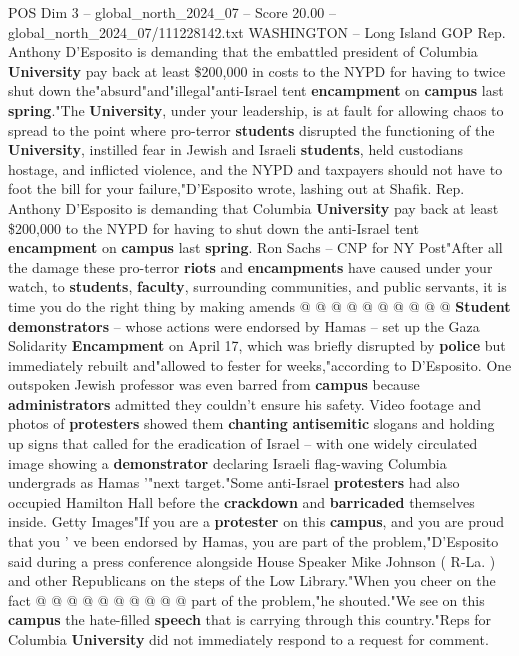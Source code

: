\begin{textsample}{POS Dim 3 – global\_north\_2024\_07 – Score 20.00 – global\_north\_2024\_07/111228142.txt}  \label{ex:f3_pos_084}
WASHINGTON -- Long Island GOP Rep.
Anthony D'Esposito is demanding that the embattled president of Columbia \textbf{University} pay back at least \$200,000 in costs to the NYPD for having to twice shut down the"absurd"and"illegal"anti-Israel tent \textbf{encampment} on \textbf{campus} last \textbf{spring}."The \textbf{University}, under your leadership, is at fault for allowing chaos to spread to the point where pro-terror \textbf{students} disrupted the functioning of the \textbf{University}, instilled fear in Jewish and Israeli \textbf{students}, held custodians hostage, and inflicted violence, and the NYPD and taxpayers should not have to foot the bill for your failure,"D'Esposito wrote, lashing out at Shafik.
Rep.
Anthony D'Esposito is demanding that Columbia \textbf{University} pay back at least \$200,000 to the NYPD for having to shut down the anti-Israel tent \textbf{encampment} on \textbf{campus} last \textbf{spring}.
Ron Sachs -- CNP for NY Post"After all the damage these pro-terror \textbf{riots} and \textbf{encampments} have caused under your watch, to \textbf{students}, \textbf{faculty}, surrounding communities, and public servants, it is time you do the right thing by making amends @ @ @ @ @ @ @ @ @ @ \textbf{Student} \textbf{demonstrators} -- whose actions were endorsed by Hamas -- set up the Gaza Solidarity \textbf{Encampment} on April 17, which was briefly disrupted by \textbf{police} but immediately rebuilt and"allowed to fester for weeks,"according to D'Esposito.
One outspoken Jewish professor was even barred from \textbf{campus} because \textbf{administrators} admitted they couldn't ensure his safety.
Video footage and photos of \textbf{protesters} showed them \textbf{chanting} \textbf{antisemitic} slogans and holding up signs that called for the eradication of Israel -- with one widely circulated image showing a \textbf{demonstrator} declaring Israeli flag-waving Columbia undergrads as Hamas '"next target."Some anti-Israel \textbf{protesters} had also occupied Hamilton Hall before the \textbf{crackdown} and \textbf{barricaded} themselves inside.
Getty Images"If you are a \textbf{protester} on this \textbf{campus}, and you are proud that you ' ve been endorsed by Hamas, you are part of the problem,"D'Esposito said during a press conference alongside House Speaker Mike Johnson ( R-La. ) and other Republicans on the steps of the Low Library."When you cheer on the fact @ @ @ @ @ @ @ @ @ @ part of the problem,"he shouted."We see on this \textbf{campus} the hate-filled \textbf{speech} that is carrying through this country."Reps for Columbia \textbf{University} did not immediately respond to a request for comment.

\end{textsample}
